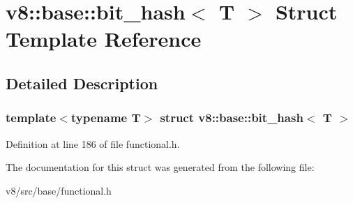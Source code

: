 \hypertarget{structv8_1_1base_1_1bit__hash}{}\section{v8\+:\+:base\+:\+:bit\+\_\+hash$<$ T $>$ Struct Template Reference}
\label{structv8_1_1base_1_1bit__hash}


\subsection{Detailed Description}
\subsubsection*{template$<$typename T$>$\newline
struct v8\+::base\+::bit\+\_\+hash$<$ T $>$}



Definition at line 186 of file functional.\+h.



The documentation for this struct was generated from the following file\+:\begin{DoxyCompactItemize}
\item 
v8/src/base/functional.\+h\end{DoxyCompactItemize}
